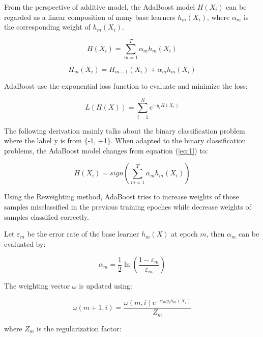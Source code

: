 \documentclass[journal, a4paper]{IEEEtran}
\begin{document}
From the perspective of additive model, the AdaBoost model $H\left(X_i\right)$ can be regarded as a linear composition of many base learners $h_m\left(X_i\right)$, where $\alpha_m$ is the corresponding weight of $h_m\left(X_i\right)$.

\begin{equation}
H\left(X_i\right)=\sum_{m=1}^{T}{\alpha_mh_m\left(X_i\right)}\label{eq:1}
\end{equation}


\begin{equation}
H_m\left(X_i\right)=H_{m-1}\left(X_i\right)+\alpha_mh_m\left(X_i\right)
\end{equation}

AdaBoost use the exponential loss function to evaluate and minimize the loss:

\begin{equation}
L\left(H\left(X\right)\right)=\sum_{i=1}^{N}{e^{-y_iH\left(X_i\right)}}
\end{equation}

The following derivation mainly talks about the binary classification problem where the label y is from \{-1, +1\}.
When adapted to the binary classification problems, the AdaBoost model changes from equation (\ref{eq:1}) to:

\begin{equation}
H\left(X_i\right)=sign\left(\sum_{m=1}^{T}{\alpha_mh_m\left(X_i\right)}\right)
\end{equation}

Using the Reweighting method, AdaBoost tries to increase weights of those samples misclassified in the previous training epoches while decrease weights of samples classified correctly.

Let $\varepsilon_m$ be the error rate of the base learner $h_m\left(X\right)$ at epoch $m$, then $\alpha_m$ can be evaluated by:

\begin{equation}
\alpha_m=\frac{1}{2}\ln\left(\frac{1-\varepsilon_m}{\varepsilon_m}\right)
\end{equation}

The weighting vector $\omega$ is updated using:

\begin{equation}
\omega\left(m+1,i\right)=\frac{\omega\left(m,i\right)e^{-\alpha_my_ih_m\left(X_i\right)}}{Z_{m}}
\end{equation}

where $Z_{m}$ is the regularization factor:
\end{document}
